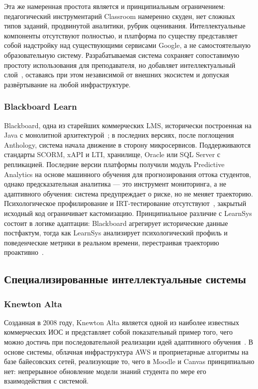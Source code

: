 Эта же намеренная простота является и принципиальным
ограничением: педагогический инструментарий Classroom
намеренно скуден, нет сложных типов заданий, продвинутой
аналитики, рубрик оценивания. Интеллектуальные компоненты
отсутствуют полностью, и платформа по существу представляет
собой надстройку над существующими сервисами Google, а
не самостоятельную образовательную систему. Разрабатываемая система 
сохраняет сопоставимую простоту использования для
преподавателя, но добавляет интеллектуальный
слой~\cite{conceptual_etraining}, оставаясь при этом
независимой от внешних экосистем и допуская развёртывание
на любой инфраструктуре.

\subsubsection{Blackboard Learn}

Blackboard, одна из старейших коммерческих LMS,
исторически построенная на Java с монолитной
архитектурой~\cite{blackboard2026official}; в последних
версиях, после поглощения Anthology, система начала движение
в сторону микросервисов. Поддерживаются стандарты SCORM,
xAPI и LTI, хранилище, Oracle или SQL Server с репликацией.
Последние версии платформы получили модуль Predictive
Analytics на основе машинного обучения для прогнозирования
оттока студентов, однако предсказательная аналитика ---
это инструмент мониторинга, а не адаптивного обучения:
система предупреждает о риске, но не меняет траекторию.
Психологическое профилирование и IRT-тестирование
отсутствуют~\cite{review_elearning_2016}, закрытый исходный
код ограничивает кастомизацию. Принципиальное различие с
LearnSys состоит в логике адаптации: Blackboard агрегирует
исторические данные постфактум, тогда как LearnSys
анализирует психологический профиль и поведенческие метрики
в реальном времени, перестраивая траекторию
проактивно~\cite{woolf2009building}.

\subsection{Специализированные интеллектуальные системы}

\subsubsection{Knewton Alta}

Созданная в 2008 году, Knewton Alta является одной из
наиболее известных коммерческих ИОС и представляет собой
показательный пример того, чего можно достичь при
последовательной реализации идей адаптивного
обучения~\cite{knewton2026official, brusilovsky2007usermodels}.
В основе системы, облачная инфраструктура AWS и
проприетарные алгоритмы на базе байесовских сетей,
реализующие то, чего в Moodle и Canvas принципиально нет:
непрерывное обновление модели знаний студента по мере его
взаимодействия с системой.

